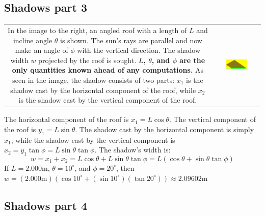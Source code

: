 \documentclass{article}
\begin{document}
\subsection*{Shadows part 3}

\begin{tabular}{cc}
\parbox{0.5\textwidth}{
In the image to the right, an angled roof with a length of \(L\) and incline angle \(\theta\) is shown. The sun's rays are parallel and now make an angle of \(\phi\) with the vertical direction. The shadow width \(w\) projected by the roof is sought.  {\bf \(L\), \(\theta\), and \(\phi\) are the only quantities known ahead of any computations.} As seen in the image, the shadow consists of two parts: \(x_1\) is the shadow cast by the horizontal component of the roof, while \(x_2\) is the shadow cast by the vertical component of the roof. 
} & \parbox{0.5\textwidth}{
\includegraphics[width = 0.5\textwidth]{angled_roof_3}
}
\end{tabular}
The horizontal component of the roof is \(x_1 = L\cos\theta\). The vertical component of the roof is \(y_1 = L\sin\theta\). The shadow cast by the horizontal component is simply \(x_1\), while the shadow cast by the vertical component is \(x_2 = y_1\tan\phi = L\sin\theta\tan\phi\). The shadow's width is: 
\[w = x_1 + x_2 = L\cos\theta + L\sin\theta\tan\phi = L(\cos\theta + \sin\theta\tan\phi)\]
If \(L = 2.000\text{m}\), \(\theta = 10^\circ\), and \(\phi = 20^\circ\), then \\ \(w = (2.000\text{m})(\cos 10^\circ + (\sin 10^\circ)(\tan 20^\circ)) \approx 2.09602\text{m}\)



\subsection*{Shadows part 4}
\end{document}
